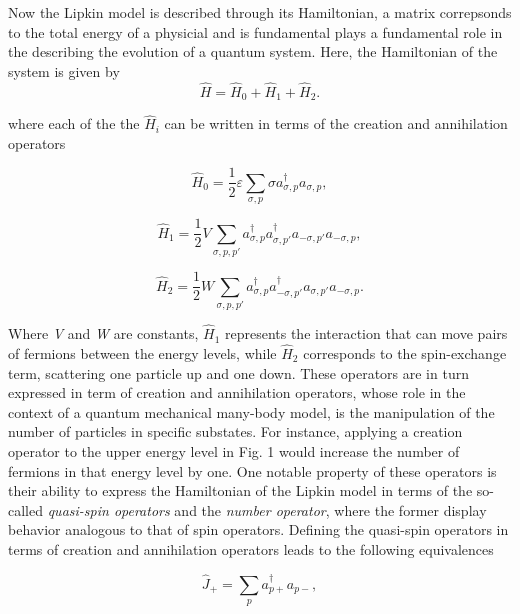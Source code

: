 \documentclass[onecolumn,10pt,cleanfoot]{asme2ej}
\begin{document}
Now the Lipkin model is described through its Hamiltonian, a matrix correpsonds to the total energy of a physicial and is fundamental plays a fundamental role in the describing the evolution of a quantum system. Here, the Hamiltonian of the system is given by 
\begin{equation}
\hat{H} = \hat{H}_{0} + \hat{H}_{1} + \hat{H}_{2}.
\end{equation}

where each of the the $\hat{H}_{i}$ can be written in terms of the creation and annihilation operators

\begin{equation}
\hat{H}_0 = \frac{1}{2}\varepsilon\sum_{\sigma,p}\sigma a_{\sigma,p}^{\dagger}a_{\sigma,p},
\end{equation}

\begin{equation}
\hat{H}_1 = \frac{1}{2}V\sum_{\sigma,p,p'} a_{\sigma,p}^{\dagger}a_{\sigma,p'}^{\dagger}a_{-\sigma,p'}a_{-\sigma,p},
\end{equation}

\begin{equation}
\hat{H}_2 = \frac{1}{2}W\sum_{\sigma,p,p'} a_{\sigma,p}^{\dagger}a_{-\sigma,p'}^{\dagger}a_{\sigma,p'}a_{-\sigma,p}.
\end{equation}

Where \textit{V} and \textit{W} are constants, $\hat{H}_1$ represents the interaction that can move pairs of fermions between the energy levels, while $\hat{H}_2$ corresponds to the spin-exchange term, scattering one particle up and one down. These operators are in turn expressed in term of creation and annihilation operators, whose role in the context of a quantum mechanical many-body model, is the manipulation of the number of particles in specific substates. For instance, applying a creation operator to the upper energy level in Fig. 1 would increase the number of fermions in that energy level by one. One notable property of these operators is their ability to express the Hamiltonian of the Lipkin model in terms of the so-called \textit{quasi-spin operators} and the \textit{number operator}, where the former display behavior analogous to that of spin operators. Defining the quasi-spin operators in terms of creation and annihilation operators leads to the following equivalences 

\begin{equation}
\hat{J}_{+} = \sum_{p} a_{p+}^{\dagger}a_{p-},
\end{equation}
\end{document}
